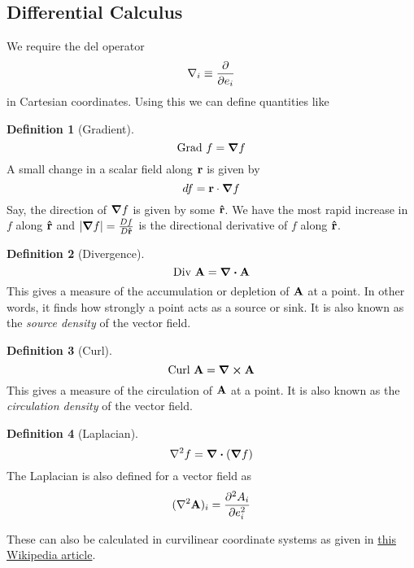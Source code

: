\documentclass[10pt, a4paper]{extarticle}
\theoremstyle{definition}
\newtheorem{defn}{Definition}
\numberwithin{equation}{subsection}
\begin{document}
\subsection{Differential Calculus}
We require the del operator
\begin{equation}\nabla_i\equiv\pdv{}{e_i}\end{equation} in Cartesian coordinates. Using this we can define quantities like
\begin{framed}
	\begin{defn}[Gradient]
		\begin{equation*}\text{Grad }f=\grad f\end{equation*}
		A small change in a scalar field along $\vb{r}$ is given by
		\begin{equation}\label{differential}df=\vb{r}\cdot\grad f\end{equation}
		Say, the direction of $\grad f$ is given by some $\vu{r}$. We have the most rapid increase in $f$ along $\vu{r}$ and $|\grad f|=\frac{Df}{D\vu{r}}$ is the directional derivative of $f$ along $\vu{r}$.
	\end{defn}

	\begin{defn}[Divergence]
		\begin{equation*}\text{Div }\vb{A}=\div\vb{A}\end{equation*}
		This gives a measure of the accumulation or depletion of $\vb{A}$ at a point. In other words, it finds how strongly a point acts as a source or sink. It is also known as the \emph{source density} of the vector field.
	\end{defn}

	\begin{defn}[Curl]
		\begin{equation*}\text{Curl }\vb{A}=\curl\vb{A}\end{equation*}
		This gives a measure of the circulation of $\vb{A}$ at a point. It is also known as the \emph{circulation density} of the vector field.
	\end{defn}

	\begin{defn}[Laplacian]
		\begin{equation}\laplacian f=\div(\grad f)\end{equation}
		The Laplacian is also defined for a vector field as
		\begin{equation}(\laplacian\vb{A})_i=\pdv[2]{A_i}{e_i}\end{equation}
	\end{defn}
\end{framed}
These can also be calculated in curvilinear coordinate systems as given in \href{https://en.wikipedia.org/wiki/Del_in_cylindrical_and_spherical_coordinates}{this Wikipedia article}.
\end{document}
